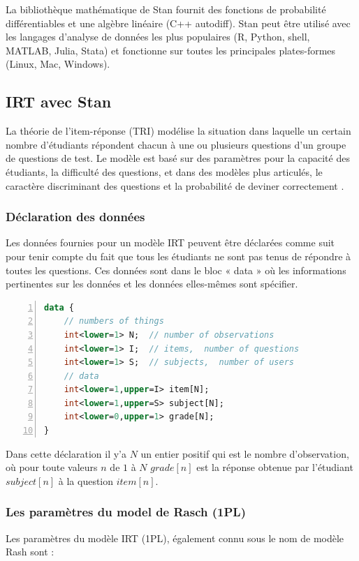 La bibliothèque mathématique de Stan fournit des fonctions de probabilité différentiables et une algèbre linéaire (C++ autodiff).
Stan peut être utilisé avec les langages d'analyse de données les plus populaires (R, Python, shell, MATLAB, Julia, Stata) et fonctionne sur toutes les principales plates-formes (Linux, Mac, Windows).

\subsection{IRT avec Stan}
La théorie de l'item-réponse (TRI) modélise la situation dans laquelle un certain nombre d'étudiants répondent chacun à une ou plusieurs questions d'un groupe de questions de test. Le modèle est basé sur des paramètres pour la capacité des étudiants, la difficulté des questions, et dans des modèles plus articulés, le caractère discriminant des questions et la probabilité de deviner correctement \cite{data_analysis_irt}.

\subsubsection{Déclaration des données}
Les données fournies pour un modèle IRT peuvent être déclarées comme suit pour tenir compte du fait que tous les étudiants ne sont pas tenus de répondre à toutes les questions. Ces données sont dans le bloc « data » où les informations pertinentes sur les données et les données elles-mêmes sont spécifier.

\newpage
\begin{lstlisting}[language=Stan,basicstyle=\scriptsize, frame=l,framesep=4.5mm,framexleftmargin=2.5mm,tabsize=2,numbers=left,fillcolor=\color{blueforest!70},rulecolor=\color{blueforest},numberstyle=\normalfont\tiny\color{white}]
data {
	// numbers of things
	int<lower=1> N;  // number of observations
	int<lower=1> I;  // items,  number of questions  
	int<lower=1> S;  // subjects,  number of users 
	// data
	int<lower=1,upper=I> item[N];
	int<lower=1,upper=S> subject[N];
	int<lower=0,upper=1> grade[N];
}
\end{lstlisting}
Dans cette déclaration il y’a \(\displaystyle N \) un entier positif qui est le nombre d’observation, où pour toute valeurs \(\displaystyle n \) de \(\displaystyle 1 \) à \(\displaystyle N \) \(\displaystyle grade[n] \) est la réponse obtenue par l’étudiant \(\displaystyle subject[n] \) à la question \(\displaystyle item[n] \).

\subsubsection{Les paramètres du model de Rasch (1PL)}
Les paramètres du modèle IRT (1PL), également connu sous le nom de modèle Rash sont :

